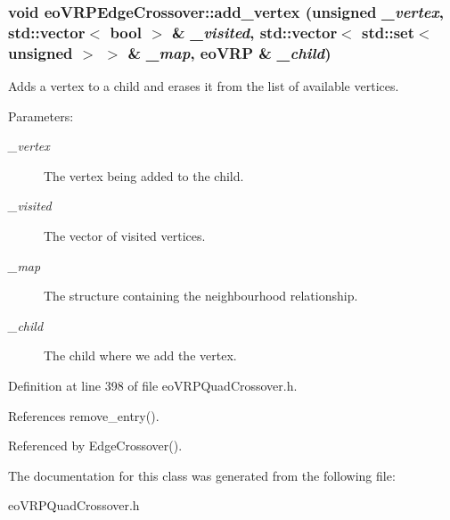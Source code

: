 \subsubsection{\setlength{\rightskip}{0pt plus 5cm}void eo\-VRPEdge\-Crossover::add\_\-vertex (unsigned {\em \_\-vertex}, std::vector$<$ bool $>$ \& {\em \_\-visited}, std::vector$<$ std::set$<$ unsigned $>$ $>$ \& {\em \_\-map}, \bf{eo\-VRP} \& {\em \_\-child})\hspace{0.3cm}{\tt  [inline, private]}}\label{classeo_v_r_p_edge_crossover_7917ea1dec6221f71127c6fae9515e68}


Adds a vertex to a child and erases it from the list of available vertices. 

\begin{Desc}
\item[Parameters:]
\begin{description}
\item[{\em \_\-vertex}]The vertex being added to the child. \item[{\em \_\-visited}]The vector of visited vertices. \item[{\em \_\-map}]The structure containing the neighbourhood relationship. \item[{\em \_\-child}]The child where we add the vertex. \end{description}
\end{Desc}


Definition at line 398 of file eo\-VRPQuad\-Crossover.h.

References remove\_\-entry().

Referenced by Edge\-Crossover().

The documentation for this class was generated from the following file:\begin{CompactItemize}
\item 
eo\-VRPQuad\-Crossover.h\end{CompactItemize}
